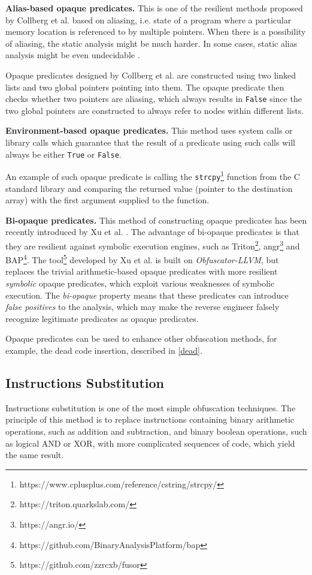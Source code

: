 \documentclass[
  digital, %
  notable,   %
  twoside, %
  nolof,     %
  nolot,     %
]{fithesis3}
\theoremstyle{definition}
\begin{document}
\textbf{Alias-based opaque predicates.} This is one of the resilient methods proposed by Collberg et al. \cite{manufacturing_opaque} based on aliasing, i.e. state of a program where a particular memory location is referenced to by multiple pointers. When there is a possibility of aliasing, the static analysis might be much harder. In some cases, static alias analysis might be even undecidable \cite{aliasing_hard}.

Opaque predicates designed by Collberg et al. are constructed using two linked lists and two global pointers pointing into them. The opaque predicate then checks whether two pointers are aliasing, which always results in \texttt{False} since the two global pointers are constructed to always refer to nodes within different lists. 

\textbf{Environment-based opaque predicates.}
This method uses system calls or library calls which guarantee that the result of a predicate using such calls will always be either \texttt{True} or \texttt{False}. 

An example of such opaque predicate is calling the \texttt{strcpy}\footnote{https://www.cplusplus.com/reference/cstring/strcpy/} function from the C standard library and comparing the returned value (pointer to the destination array) with the first argument supplied to the function.

\textbf{Bi-opaque predicates.} This method of constructing opaque predicates has been recently introduced by Xu et al. \cite{bi_opaque}. The advantage of bi-opaque predicates is that they are resilient against symbolic execution engines, such as Triton\footnote{https://triton.quarkslab.com/}, angr\footnote{https://angr.io/} and BAP\footnote{https://github.com/BinaryAnalysisPlatform/bap}. The tool\footnote{https://github.com/zzrcxb/fusor} developed by Xu et al. is built on \textit{Obfuscator-LLVM}, but replaces the trivial arithmetic-based opaque predicates with more resilient \textit{symbolic} opaque predicates, which exploit various weaknesses of symbolic execution. The \textit{bi-opaque} property means that these predicates can introduce \textit{false positives} to the analysis, which may make the reverse engineer falsely recognize legitimate predicates as opaque predicates.

Opaque predicates can be used to enhance other obfuscation methods, for example, the dead code insertion, described in \ref{dead}. 

\subsection{Instructions Substitution} \label{substitution}
Instructions substitution is one of the most simple obfuscation techniques. The principle of this method is to replace instructions containing binary arithmetic operations, such as addition and subtraction, and binary boolean operations, such as logical AND or XOR, with more complicated sequences of code, which yield the same result. 
\end{document}
